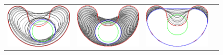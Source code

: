 \begin{figure}
\begin{tabular}{cccc}
\includegraphics[scale=0.2]{figures/chapter9/free-elastica/localsearch/bean/len_pen-0.01/radius-7/summary.pdf} & 
\includegraphics[scale=0.2]{figures/chapter9/free-elastica/flipflow/bean/len_pen-0.01/radius-7/summary.pdf} &
\includegraphics[scale=0.2]{figures/chapter9/free-elastica/balanceflow/bean/len_pen-0.01/radius-7/summary.pdf} &

\end{tabular}
\end{figure}
